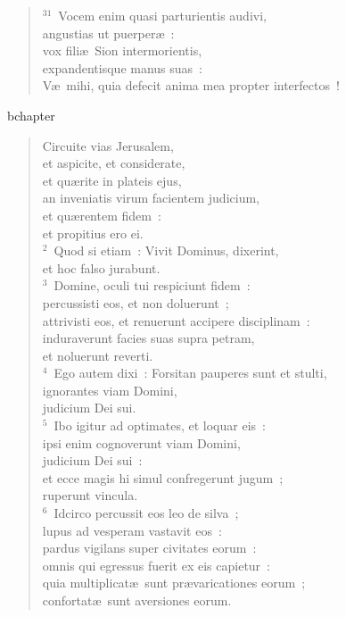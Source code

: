 \begin{flushleft}
\begin{verse}
${}^{31}$~Vocem enim quasi parturientis audivi,\\ angustias ut puerper\ae~:\\ vox fili\ae\ Sion intermorientis,\\ expandentisque manus suas~:\\ V\ae\ mihi, quia defecit anima mea propter interfectos~!\end{verse}\end{flushleft}


bchapter\begin{flushleft}\begin{verse}\vspace{-19pt}Circuite vias Jerusalem,\\ et aspicite, et considerate,\\ et qu\ae rite in plateis ejus,\\ an inveniatis virum facientem judicium,\\ et qu\ae rentem fidem~:\\ et propitius ero ei.\\
${}^{2}$~Quod si etiam~: Vivit Dominus, dixerint,\\ et hoc falso jurabunt.\\
${}^{3}$~Domine, oculi tui respiciunt fidem~:\\ percussisti eos, et non doluerunt~;\\ attrivisti eos, et renuerunt accipere disciplinam~:\\ induraverunt facies suas supra petram,\\ et noluerunt reverti.\\
${}^{4}$~Ego autem dixi~: Forsitan pauperes sunt et stulti,\\ ignorantes viam Domini,\\ judicium Dei sui.\\
${}^{5}$~Ibo igitur ad optimates, et loquar eis~:\\ ipsi enim cognoverunt viam Domini,\\ judicium Dei sui~:\\ et ecce magis hi simul confregerunt jugum~;\\ ruperunt vincula.\\
${}^{6}$~Idcirco percussit eos leo de silva~;\\ lupus ad vesperam vastavit eos~:\\ pardus vigilans super civitates eorum~:\\ omnis qui egressus fuerit ex eis capietur~:\\ quia multiplicat\ae\ sunt pr\ae varicationes eorum~;\\ confortat\ae\ sunt aversiones eorum.\\

\end{verse}
\end{flushleft}
